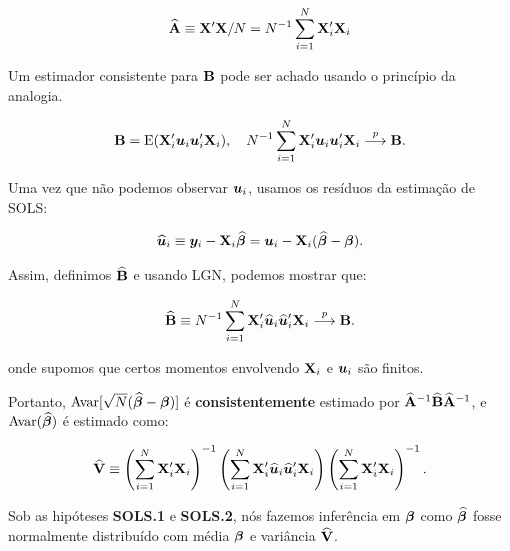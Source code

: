 \documentclass[11pt, oneside, a4paper, article]{article}
\numberwithin{equation}{section}
\begin{document}
\vspace{-1 em}
\begin{align*}
	\widehat{\mathbf{A}} \equiv \mathbf{X}'\mathbf{X}/N = N^{-1} \sum_{i=1}^{N} \mathbf{X}_{i}'\mathbf{X}_{i}
\end{align*}

Um estimador consistente para $\mathbf{B}$ pode ser achado usando o princípio da analogia.

\vspace{-1 em}
\begin{align*}
	\mathbf{B} = \text{E}(\mathbf{X}_{i}' \boldsymbol{u}_{i} \boldsymbol{u}_{i}' \mathbf{X}_{i}), 
	\quad
	N^{-1}\sum_{i=1}^{N} \mathbf{X}_{i}' \boldsymbol{u}_{i} \boldsymbol{u}_{i}' \mathbf{X}_{i}  \overset{p}{\longrightarrow}  \mathbf{B}.
\end{align*}

Uma vez que não podemos observar $\boldsymbol{u}_{i}$, usamos os resíduos da estimação de SOLS:

\vspace{-1 em}
\begin{align*}
	\widehat{\boldsymbol{u}}_{i} \equiv \boldsymbol{y}_{i} - \mathbf{X}_{i} \widehat{\boldsymbol{\beta}} 
	=
	\boldsymbol{u}_{i} - \mathbf{X}_{i} (\widehat{\boldsymbol{\beta}} - \boldsymbol{\beta}).
\end{align*}

Assim, definimos $\widehat{\mathbf{B}}$ e usando LGN, podemos mostrar que:

\vspace{-1 em}
\begin{align*}
	\widehat{\mathbf{B}} \equiv N^{-1}\sum_{i=1}^{N} \mathbf{X}_{i}' \widehat{\boldsymbol{u}}_{i} \widehat{\boldsymbol{u}}_{i}' \mathbf{X}_{i} 
	 \overset{p}{\longrightarrow}  \mathbf{B}.
\end{align*}

\noindent
onde supomos que certos momentos envolvendo $\mathbf{X}_{i}$ e $\boldsymbol{u}_{i}$ são finitos.

Portanto, $\text{Avar}[\sqrt{N}(\widehat{\boldsymbol{\beta}} - \boldsymbol{\beta})]$ é \textbf{consistentemente} estimado por $\widehat{\mathbf{A}}^{-1} \widehat{\mathbf{B}} \widehat{\mathbf{A}}^{-1}$, e $\text{Avar}(\widehat{\boldsymbol{\beta}})$ é estimado como:

\vspace{-1 em}
\begin{align*}
	\widehat{\mathbf{V}} \equiv 
	\left( \sum_{i=1}^{N} \mathbf{X}_{i}' \mathbf{X}_{i}  \right)^{-1}
	\left( \sum_{i=1}^{N} \mathbf{X}_{i}' \widehat{\boldsymbol{u}}_{i} \widehat{\boldsymbol{u}}_{i}'  \mathbf{X}_{i}  \right)
	\left( \sum_{i=1}^{N} \mathbf{X}_{i}' \mathbf{X}_{i}  \right)^{-1}.
\end{align*}

Sob as hipóteses \textbf{SOLS.1} e \textbf{SOLS.2}, nós fazemos inferência em $\boldsymbol{\beta}$ como $\widehat{\boldsymbol{\beta}}$ fosse normalmente distribuído com média $\boldsymbol{\beta}$ e variância $\widehat{\mathbf{V}}$.
\end{document}
